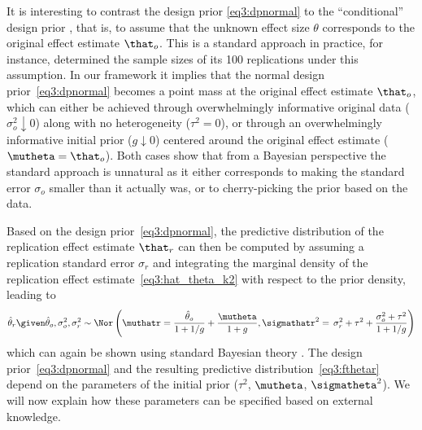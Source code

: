 It is interesting to contrast the design prior \eqref{eq3:dpnormal} to the
``conditional'' design prior \citep{Micheloud2020}, that is, to assume that the
unknown effect size $\theta$ corresponds to the original effect estimate
$\that_{o}$. This is a standard approach in practice, for instance,
\citet{Opensc2015} determined the sample sizes of its 100 replications under
this assumption. In our framework it implies that the normal design
prior~\eqref{eq3:dpnormal} becomes a point mass at the original effect estimate
$\that_{o}$, which can either be achieved through overwhelmingly informative
original data ($\sigma^{2}_{o} \downarrow 0$) along with no heterogeneity
($\tau^{2} = 0$), or through an overwhelmingly informative initial prior
($g \downarrow 0$) centered around the original effect estimate
($\mutheta = \that_{o}$). Both cases show that from a Bayesian perspective the
standard approach is unnatural as it either corresponds to making the standard
error $\sigma_{o}$ smaller than it actually was, or to cherry-picking the prior
based on the data.


Based on the design prior~\eqref{eq3:dpnormal}, the predictive distribution of
the replication effect estimate $\that_{r}$ can then be computed by assuming a
replication standard error $\sigma_{r}$ and integrating the marginal density of
the replication effect estimate~\eqref{eq3:hat_theta_k2} with respect to the
prior density, leading to
\begin{align}
  \label{eq3:fthetar}
  \hat{\theta}_r \given \hat{\theta}_o, \sigma^2_o, \sigma^2_r
  \sim
  \Nor\left(\muthatr =
  \frac{\hat{\theta}_o}{1 + 1/g} + \frac{\mutheta}{1 + g}, \sigmathatr^{2} =
  \, \sigma^2_r + \tau^2 + \frac{\sigma^2_o + \tau^2}{1 + 1/g}\right)
\end{align}
which can again be shown using standard Bayesian theory \citep[ch.
3.13.3]{Spiegelhalter2004}.
The design prior~\eqref{eq3:dpnormal} and the resulting predictive
distribution~\eqref{eq3:fthetar}
depend on the parameters of the initial prior ($\tau^ {2}$, $\mutheta$,
$\sigmatheta^{2}$). We will now explain how these parameters can be specified
based on external knowledge.

